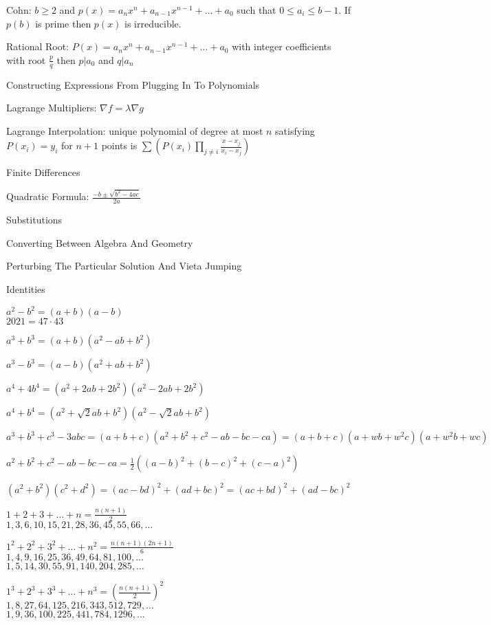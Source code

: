 Cohn: $b \ge 2$ and $p(x)=a_n x^n + a_{n-1} x^{n-1} + \dots +a_0$ such that $0 \le a_i \le b-1$. If $p(b)$ is prime then $p(x)$ is irreducible.

Rational Root: $P(x)=a_n x^n+a_{n-1}x^{n-1}+\dots +a_0$ with integer coefficients with root $\frac{p}{q}$ then $p | a_0$ and $q | a_n$

Constructing Expressions From Plugging In To Polynomials

Lagrange Multipliers: $\nabla f = \lambda \nabla g$

Lagrange Interpolation: unique polynomial of degree at most $n$ satisfying $P(x_i)=y_i$ for $n+1$ points is $\sum \left(P(x_i)\prod_{j \neq i}\frac{x-x_j}{x_i-x_j} \right)$

Finite Differences

Quadratic Formula: $\frac{-b \pm \sqrt{b^2-4ac}}{2a}$

Substitutions

Converting Between Algebra And Geometry

Perturbing The Particular Solution And Vieta Jumping

Identities

$a^2-b^2=(a+b)(a-b)$ \\
$2021=47 \cdot 43$

$a^3+b^3=(a+b)(a^2-ab+b^2)$

$a^3-b^3=(a-b)(a^2+ab+b^2)$

$a^4+4b^4=(a^2+2ab+2b^2)(a^2-2ab+2b^2)$

$a^4+b^4=(a^2+\sqrt{2}ab+b^2)(a^2-\sqrt{2}ab+b^2)$

$a^3+b^3+c^3-3abc=(a+b+c)(a^2+b^2+c^2-ab-bc-ca)=(a+b+c)(a+wb+w^2c)(a+w^2b+wc)$

$a^2+b^2+c^2-ab-bc-ca=\frac{1}{2}((a-b)^2+(b-c)^2+(c-a)^2)$

$(a^2+b^2)(c^2+d^2)=(ac-bd)^2+(ad+bc)^2=(ac+bd)^2+(ad-bc)^2$

$1+2+3+\dots+n = \frac{n(n+1)}{2}$ \\
$1,3,6,10,15,21,28,36,45,55,66,\dots$

$1^2+2^2+3^2+\dots+n^2 = \frac{n(n+1)(2n+1)}{6}$ \\
$1,4,9,16,25,36,49,64,81,100,\dots$ \\
$1,5,14,30,55,91,140,204,285,\dots$

$1^3+2^3+3^3+\dots+n^3 = \left( \frac{n(n+1)}{2} \right)^2$ \\
$1,8,27,64,125,216,343,512,729,\dots$ \\
$1,9,36,100,225,441,784,1296,\dots$

